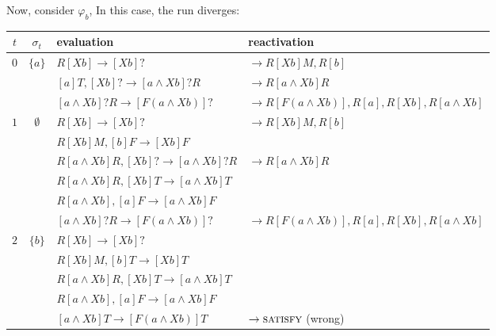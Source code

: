 Now, consider $\varphi_b$, In this case, the run diverges:
\begin{center}\small
\begin{tabular}{c c l l}
\toprule
$t$ & $\sigma_t$ & evaluation & reactivation\\
\midrule
\multirow{3}{*}{$0$} & \multirow{3}{*}{$\{a\}$} & $R[Xb] \rightarrow [Xb]?$ & $\rightarrow R[Xb]M,R[b]$ \\
&  & $[a]T,[Xb]? \rightarrow [a \land Xb]?R$ & $\rightarrow R[a \land Xb]R$  \\
&  & $[a \land Xb]?R \rightarrow [F(a \land Xb)]?$ & $\rightarrow R[F(a \land Xb)],R[a],R[Xb],R[a \land Xb]$ \\[1.5ex]

\multirow{6}{*}{$1$} & \multirow{6}{*}{$\emptyset$} & $R[Xb] \rightarrow [Xb]?$ & $\rightarrow R[Xb]M,R[b]$ \\
& & $R[Xb]M, [b]F \rightarrow [Xb]F$ & \\
&  & $R[a \land Xb]R,[Xb]? \rightarrow [a \land Xb]?R$ & $\rightarrow R[a \land Xb]R$  \\
&  & $R[a \land Xb]R,[Xb]T \rightarrow [a \land Xb]T$ &  \\
&  & $R[a \land Xb],[a]F \rightarrow [a \land Xb]F$ &  \\
&  & $[a \land Xb]?R \rightarrow [F(a \land Xb)]?$ & $\rightarrow R[F(a \land Xb)],R[a],R[Xb],R[a \land Xb]$ \\[1.5ex]

\multirow{5}{*}{$2$} & \multirow{5}{*}{$\{b\}$} & $R[Xb] \rightarrow [Xb]?$ & \\
& & $R[Xb]M, [b]T \rightarrow [Xb]T$ & \\
&  & $R[a \land Xb]R,[Xb]T \rightarrow [a \land Xb]T$ &  \\
&  & $R[a \land Xb],[a]F \rightarrow [a \land Xb]F$ &  \\
&  & $[a \land Xb]T \rightarrow [F(a \land Xb)]T$ & $\rightarrow \textsc{satisfy}$ (wrong) \\
\bottomrule
\end{tabular}
\end{center}

